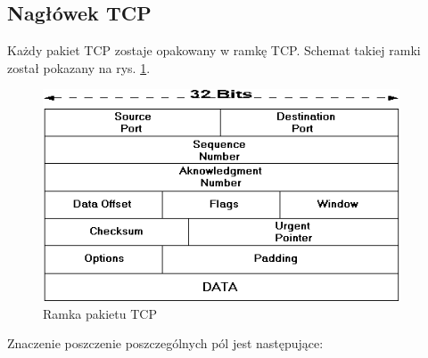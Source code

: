 		\subsection{Nagłówek TCP}
			Każdy pakiet TCP zostaje opakowany w ramkę TCP.
			Schemat takiej ramki został pokazany na rys. \ref{fig:ramka_tcp}.
			\begin{figure}[h]
				\centering
				\includegraphics[width=400px]{tcp.png}
				\caption{Ramka pakietu TCP}
				\label{fig:ramka_tcp}
			\end{figure}
			Znaczenie poszczenie poszczególnych pól jest następujące:
